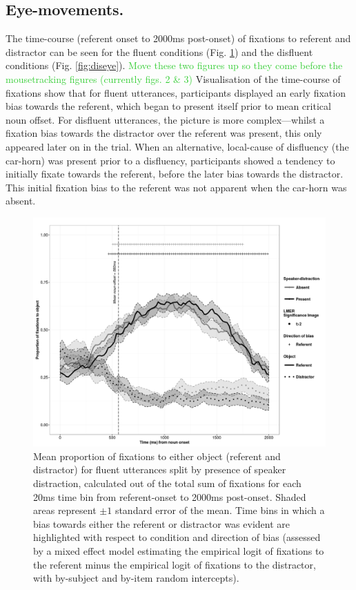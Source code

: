 \documentclass[a4paper,man,natbib]{apa6}
\newcommand\thenote[1]{\textcolor{LimeGreen}{#1}}
\begin{document}
\subsection{Eye-movements.}

The time-course (referent onset to 2000ms post-onset) of fixations to referent and distractor can be seen for the fluent conditions (Fig. \ref{fig:flueye}) and the disfluent conditions (Fig. \ref{fig:diseye}). 
\thenote{Move these two figures up so they come before the mousetracking figures (currently figs. 2 \& 3)}
Visualisation of the time-course of fixations show that for fluent utterances, participants displayed an early fixation bias towards the referent, which began to present itself prior to mean critical noun offset. 
For disfluent utterances, the picture is more complex---whilst a fixation bias towards the distractor over the referent was present, this only appeared later on in the trial.
When an alternative, local-cause of disfluency (the car-horn) was present prior to a disfluency, participants showed a tendency to initially fixate towards the referent, before the later bias towards the distractor. 
This initial fixation bias to the referent was not apparent when the car-horn was absent.\\

\begin{figure}[Ht]
  \centering
	\includegraphics[scale=.5]{fluent.png}
  \caption{Mean proportion of fixations to either object (referent and distractor) for fluent utterances split by presence of speaker distraction, calculated out of the total sum of fixations for each 20ms time bin from referent-onset to 2000ms post-onset. Shaded areas represent $\pm 1$ standard error of the mean. Time bins in which a bias towards either the referent or distractor was evident are highlighted with respect to condition and direction of bias (assessed by a mixed effect model estimating the empirical logit of fixations to the referent minus the empirical logit of fixations to the distractor, with by-subject and by-item random intercepts).}
  \label{fig:flueye}
\end{figure}
\end{document}
